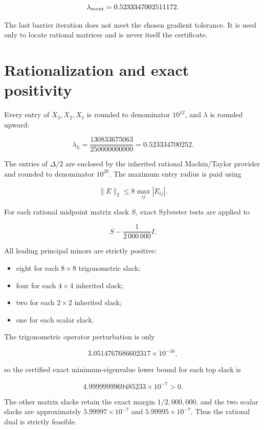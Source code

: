 \documentclass[11pt,a4paper,openany]{report}
\begin{document}
\[
\lambda_{\rm scout}=0.5233347002511172.
\]

The last barrier iteration does not meet the chosen gradient tolerance. It is used only to locate rational matrices and is never itself the certificate.

\section{Rationalization and exact positivity}

Every entry of \(X_3,X_2,X_1\) is rounded to denominator \(10^{12}\), and \(\lambda\) is rounded upward:

\[
\lambda_{\mathbb Q}
=\frac{130833675063}{250000000000}
=0.523334700252.
\]

The entries of \(\Delta/2\) are enclosed by the inherited rational Machin/\allowbreak{}Taylor provider and rounded to denominator \(10^{20}\). The maximum entry radius is paid using

\[
\lVert E\rVert_2\le8\max_{ij}|E_{ij}|.
\]

For each rational midpoint matrix slack \(S\), exact Sylvester tests are applied to

\[
S-\frac{1}{2\,000\,000}I.
\]

All leading principal minors are strictly positive:

\begin{itemize}
\item 
eight for each \(8\times8\) trigonometric slack;

\item 
four for each \(4\times4\) inherited slack;

\item 
two for each \(2\times2\) inherited slack;

\item 
one for each scalar slack.

\end{itemize}

The trigonometric operator perturbation is only

\[
3.0514767686602317\times10^{-16},
\]

so the certified exact minimum-eigenvalue lower bound for each top slack is

\[
4.9999999969485233\times10^{-7}>0.
\]

The other matrix slacks retain the exact margin \(1/2{,}000{,}000\), and the two scalar slacks are approximately \(5.99997\times10^{-7}\) and \(5.99995\times10^{-7}\). Thus the rational dual is strictly feasible.
\end{document}
